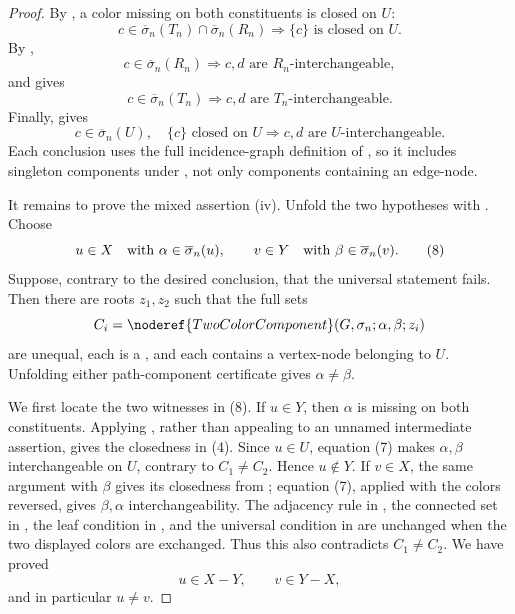 \begin{proof}
By , a color missing
on both constituents is closed on $U$:
\[
 c\in\overline\sigma_n(T_n)\cap\overline\sigma_n(R_n)
 \Longrightarrow \{c\}\text{ is closed on }U.                \tag{4}
\]
By ,
\[
 c\in\overline\sigma_n(R_n)
 \Longrightarrow c,d\text{ are $R_n$-interchangeable},       \tag{5}
\]
and  gives
\[
 c\in\overline\sigma_n(T_n)
 \Longrightarrow c,d\text{ are $T_n$-interchangeable}.       \tag{6}
\]
Finally,  gives
\[
 c\in\overline\sigma_n(U),\quad \{c\}\text{ closed on }U
 \Longrightarrow c,d\text{ are $U$-interchangeable}.         \tag{7}
\]
Each conclusion uses the full incidence-graph definition of
, so it includes singleton components under
, not only components containing an
edge-node.

It remains to prove the mixed assertion (iv).  Unfold the two hypotheses
with .  Choose
\[
 u\in X\quad\hbox{with }\alpha\in\overline\sigma_n(u),
 \qquad
 v\in Y\quad\hbox{with }\beta\in\overline\sigma_n(v).        \tag{8}
\]
Suppose, contrary to the desired conclusion, that the universal statement
 fails.  Then there are roots $z_1,z_2$ such
that the full sets
\[
 C_i=\noderef{TwoColorComponent}
       (G,\sigma_n;\alpha,\beta;z_i)
\]
are unequal, each is a , and each contains
a vertex-node belonging to $U$.  Unfolding either path-component
certificate gives $\alpha\ne\beta$.

We first locate the two witnesses in (8).  If $u\in Y$, then $\alpha$ is
missing on both constituents.  Applying
, rather than appealing to an
unnamed intermediate assertion, gives the closedness in (4).  Since
$u\in U$, equation (7) makes $\alpha,\beta$ interchangeable on $U$,
contrary to $C_1\ne C_2$.  Hence $u\notin Y$.  If $v\in X$, the same
argument with $\beta$ gives its closedness from
; equation (7), applied with
the colors reversed, gives $\beta,\alpha$ interchangeability.  The
adjacency rule in , the connected set in
, the leaf condition in
, and the universal condition in
 are unchanged when the two displayed colors
are exchanged.  Thus this also contradicts $C_1\ne C_2$.  We have proved
\[
                         u\in X-Y,\qquad v\in Y-X,             \tag{9}
\]
and in particular $u\ne v$.


\end{proof}
